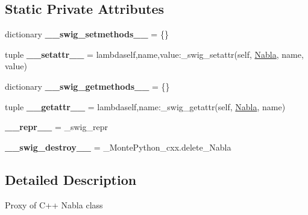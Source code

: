 \subsection*{Static Private Attributes}
\begin{DoxyCompactItemize}
\item 
\hypertarget{classMontePython__cxx_1_1Nabla_a52c5c1a0fb4ad7bb297e66846327695d}{}dictionary {\bfseries \+\_\+\+\_\+swig\+\_\+setmethods\+\_\+\+\_\+} = \{\}\label{classMontePython__cxx_1_1Nabla_a52c5c1a0fb4ad7bb297e66846327695d}

\item 
\hypertarget{classMontePython__cxx_1_1Nabla_aa727b0d16c6a63cf28b591759bd740a8}{}tuple {\bfseries \+\_\+\+\_\+setattr\+\_\+\+\_\+} = lambdaself,name,value\+:\+\_\+swig\+\_\+setattr(self, \hyperlink{classMontePython__cxx_1_1Nabla}{Nabla}, name, value)\label{classMontePython__cxx_1_1Nabla_aa727b0d16c6a63cf28b591759bd740a8}

\item 
\hypertarget{classMontePython__cxx_1_1Nabla_a5062523e5fc18a56e024984234b379df}{}dictionary {\bfseries \+\_\+\+\_\+swig\+\_\+getmethods\+\_\+\+\_\+} = \{\}\label{classMontePython__cxx_1_1Nabla_a5062523e5fc18a56e024984234b379df}

\item 
\hypertarget{classMontePython__cxx_1_1Nabla_a63cac96b295a12e057218d89594066b1}{}tuple {\bfseries \+\_\+\+\_\+getattr\+\_\+\+\_\+} = lambdaself,name\+:\+\_\+swig\+\_\+getattr(self, \hyperlink{classMontePython__cxx_1_1Nabla}{Nabla}, name)\label{classMontePython__cxx_1_1Nabla_a63cac96b295a12e057218d89594066b1}

\item 
\hypertarget{classMontePython__cxx_1_1Nabla_adbef4dcd0217ef612fa33e8f42bb5be9}{}{\bfseries \+\_\+\+\_\+repr\+\_\+\+\_\+} = \+\_\+swig\+\_\+repr\label{classMontePython__cxx_1_1Nabla_adbef4dcd0217ef612fa33e8f42bb5be9}

\item 
\hypertarget{classMontePython__cxx_1_1Nabla_a84eaadbcb8563ac20f54db78a1ebf027}{}{\bfseries \+\_\+\+\_\+swig\+\_\+destroy\+\_\+\+\_\+} = \+\_\+\+Monte\+Python\+\_\+cxx.\+delete\+\_\+\+Nabla\label{classMontePython__cxx_1_1Nabla_a84eaadbcb8563ac20f54db78a1ebf027}

\end{DoxyCompactItemize}


\subsection{Detailed Description}
\begin{DoxyVerb}Proxy of C++ Nabla class\end{DoxyVerb}
 

